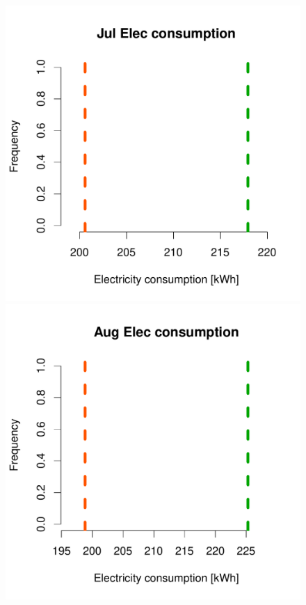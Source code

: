 \documentclass[a4paper, 12pt]{article}
\begin{document}
\begin{figure}
 \includegraphics[width=\scale]{Simulation_histograms/Batch_2_Only/Elec_Runs/Jul_Elec}
 \includegraphics[width=\scale]{Simulation_histograms/Batch_2_Only/Elec_Runs/Aug_Elec}

\end{figure}
\end{document}
